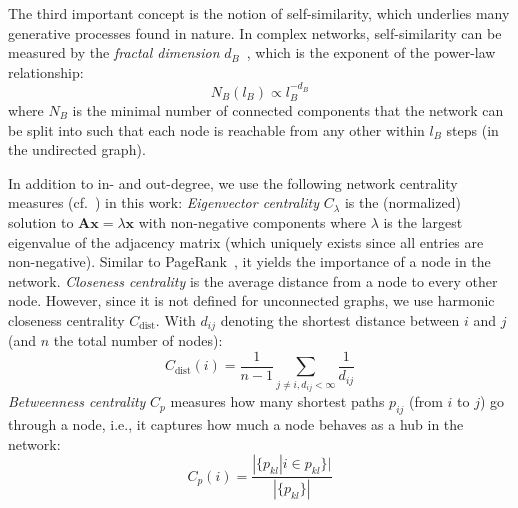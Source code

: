The third important concept is the notion of self-similarity,
which underlies many generative processes found in nature.
In complex networks,
self-similarity can be measured by the \emph{fractal dimension} $d_B$~\cite{FractalComplex2005Song}, which is the exponent of the power-law relationship:
\begin{equation}
    N_B(l_B) \propto l_B^{-d_B}
\end{equation}
where $N_B$ is the minimal number of connected components that the network can be split into
such that each node is reachable from any other within $l_B$ steps (in the undirected graph).

In addition to in- and out-degree,
we use the following network centrality measures
(cf.~\cite{SnaMetrics2003Newman}) in this work:
\emph{Eigenvector centrality} $C_\lambda$ is the (normalized) solution to
$\bm{A}\bm{x} = \lambda\bm{x}$
with non-negative components where $\lambda$ is the largest eigenvalue of the adjacency matrix
(which uniquely exists since all entries are non-negative).
Similar to PageRank~\cite{pagerank}, it yields the importance of a node in the network.
\emph{Closeness centrality} is the average distance from a node to every other node.
However, since it is not defined for unconnected graphs, we use harmonic closeness centrality $C_\text{dist}$.
With $d_{ij}$ denoting the shortest distance between $i$ and $j$ (and $n$ the total number of nodes):
\begin{equation}
    C_\text{dist}(i) = \frac{1}{n-1}\sum_{j\neq i,d_{ij}<\infty}{\frac{1}{d_{ij}}}
\end{equation}
\emph{Betweenness centrality} $C_p$ measures how many shortest paths $p_{ij}$ (from $i$ to $j$) go through a node, i.e., it captures how much a node behaves as a hub in the network:
\begin{equation}%
    C_p(i) = \frac{|\{p_{kl}|i\in p_{kl}\}|}{|\{p_{kl}\}|}
\end{equation}
